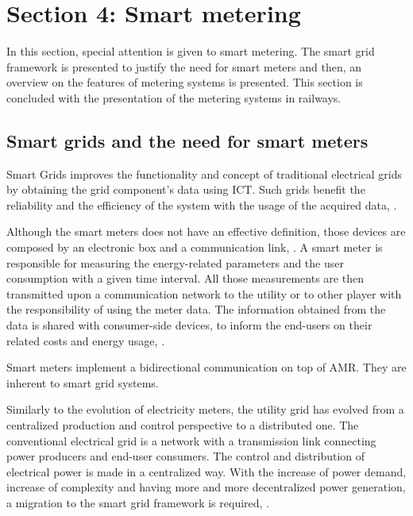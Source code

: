 


\section{Section 4: Smart metering}

In this section, special attention is given to smart metering. The smart grid framework is presented to justify the need for smart meters and then, an overview on the features of metering systems is presented.
This section is concluded with the presentation of the metering systems in railways.






\subsection{Smart grids and the need for smart meters}

Smart Grids improves the functionality and concept of traditional electrical grids by obtaining the grid component's data using \ac{ICT}. Such grids benefit the reliability and the efficiency of the system with the usage of the acquired data, \cite{Mohassel2014}.

Although the smart meters does not have an effective definition, those devices are composed by an electronic box and a communication link, \cite{Seppo2012}. A smart meter is responsible for measuring the energy-related parameters and the user consumption with a given time interval. All those measurements are then transmitted upon a communication network to the utility or to other player with the responsibility of using the meter data. The information obtained from the data is shared with consumer-side devices, to inform the end-users on their related costs and energy usage, \cite{Siano2014}.

Smart meters implement a bidirectional communication on top of \ac{AMR}. They are inherent to smart grid systems. 

Similarly to the evolution of electricity meters, the utility grid has evolved from a centralized production and control perspective to a distributed one. The conventional electrical grid is a network with a transmission link connecting power producers and end-user consumers. The control and distribution of electrical power is made in a centralized way. With the increase of power demand, increase of complexity and having more and more decentralized power generation, a migration to the smart grid framework is required, \cite{Reddy2014}.


